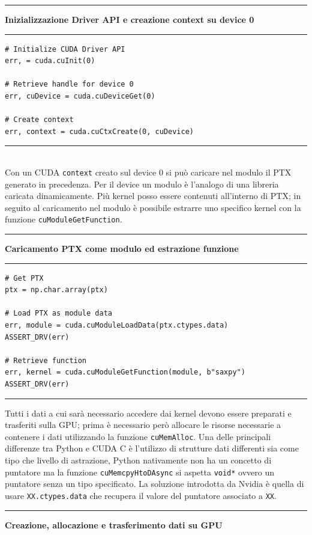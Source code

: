 \documentclass[12pt,a4paper]{report}
\begin{document}
\noindent\rule[0.5ex]{\linewidth}{2pt}
\small{\textbf{Inizializzazione Driver API e creazione context su device 0}} \\
\noindent\rule[0.5ex]{\linewidth}{1pt}
\begin{lstlisting}
# Initialize CUDA Driver API
err, = cuda.cuInit(0)

# Retrieve handle for device 0
err, cuDevice = cuda.cuDeviceGet(0)

# Create context
err, context = cuda.cuCtxCreate(0, cuDevice)
\end{lstlisting}
\noindent\rule[0.5ex]{\linewidth}{1pt} \\[10pt]
Con un CUDA \verb|context| creato sul device 0 si può caricare nel modulo il PTX generato in precedenza. Per il device un modulo è l'analogo di una libreria caricata dinamicamente. Più kernel posso essere contenuti all'interno di PTX; in seguito al caricamento nel modulo è possibile estrarre uno specifico kernel con la funzione \verb|cuModuleGetFunction|. \\[10pt]
\noindent\rule[0.5ex]{\linewidth}{2pt}
\small{\textbf{Caricamento PTX come modulo ed estrazione funzione}} \\
\noindent\rule[0.5ex]{\linewidth}{1pt}
\begin{lstlisting}
# Get PTX
ptx = np.char.array(ptx)

# Load PTX as module data
err, module = cuda.cuModuleLoadData(ptx.ctypes.data)
ASSERT_DRV(err)

# Retrieve function
err, kernel = cuda.cuModuleGetFunction(module, b"saxpy")
ASSERT_DRV(err)
\end{lstlisting}
\noindent\rule[0.5ex]{\linewidth}{1pt} \newpage
Tutti i dati a cui sarà necessario accedere dai kernel devono essere preparati e trasferiti sulla GPU; prima è necessario però allocare le risorse necessarie a contenere i dati utilizzando la funzione \verb|cuMemAlloc|. \newline
Una delle principali differenze tra Python e CUDA C è l'utilizzo di strutture dati differenti sia come tipo che livello di astrazione, Python nativamente non ha un concetto di puntatore ma la funzione \verb|cuMemcpyHtoDAsync| si aspetta \verb|void*| ovvero un puntatore senza un tipo specificato. La soluzione introdotta da Nvidia è quella di usare \verb|XX.ctypes.data| che recupera il valore del puntatore associato a \verb|XX|. \\[10pt]
\noindent\rule[0.5ex]{\linewidth}{2pt}
\small{\textbf{Creazione, allocazione e trasferimento dati su GPU}} \\
\end{document}
